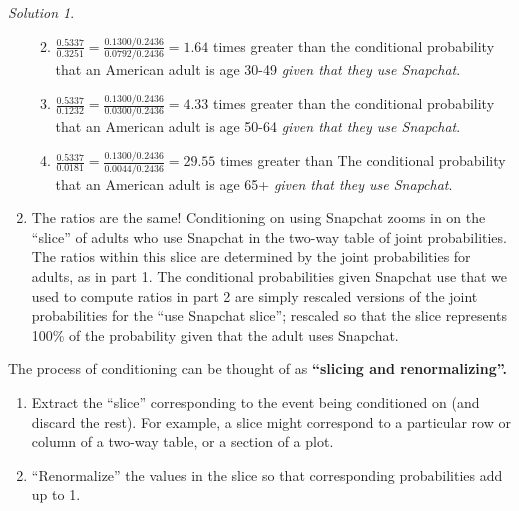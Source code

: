 \documentclass[
  letterpaper,
  DIV=11,
  numbers=noendperiod]{scrreprt}
\providecommand{\tightlist}{%
  \setlength{\itemsep}{0pt}\setlength{\parskip}{0pt}}
\theoremstyle{plain}
\theoremstyle{definition}
\theoremstyle{definition}
\theoremstyle{definition}
\theoremstyle{remark}
\newtheorem{refsolution}{Solution}[chapter]
\begin{document}
\begin{tcolorbox}
\begin{refsolution}
\begin{enumerate}
  \begin{enumerate}
  \def\labelenumii{\alph{enumii}.}
  \tightlist
  \item
    \(\frac{0.5337}{0.3251} = \frac{0.1300/0.2436}{0.0792/0.2436} = 1.64\)
    times greater than the conditional probability that an American
    adult is age 30-49 \emph{given that they use Snapchat}.
  \item
    \(\frac{0.5337}{0.1232} = \frac{0.1300/0.2436}{0.0300/0.2436}= 4.33\)
    times greater than the conditional probability that an American
    adult is age 50-64 \emph{given that they use Snapchat}.
  \item
    \(\frac{0.5337}{0.0181} = \frac{0.1300/0.2436}{0.0044/0.2436} = 29.55\)
    times greater than The conditional probability that an American
    adult is age 65+ \emph{given that they use Snapchat}.
  \end{enumerate}
\item
  The ratios are the same\footnotemark{}! Conditioning on using Snapchat
  zooms in on the ``slice'' of adults who use Snapchat in the two-way
  table of joint probabilities. The ratios within this slice are
  determined by the joint probabilities for adults, as in part 1. The
  conditional probabilities given Snapchat use that we used to compute
  ratios in part 2 are simply rescaled versions of the joint
  probabilities for the ``use Snapchat slice''; rescaled so that the
  slice represents 100\% of the probability given that the adult uses
  Snapchat.
\end{enumerate}

\label{sol-conditional-probability-def-slicing}

\end{refsolution}

\end{tcolorbox}


The process of conditioning can be thought of as \textbf{``slicing and
renormalizing''.}

\begin{enumerate}
\def\labelenumi{\arabic{enumi}.}
\tightlist
\item
  Extract the ``slice'' corresponding to the event being conditioned on
  (and discard the rest). For example, a slice might correspond to a
  particular row or column of a two-way table, or a section of a plot.\\
\item
  ``Renormalize'' the values in the slice so that corresponding
  probabilities add up to 1.
\end{enumerate}
\end{document}
